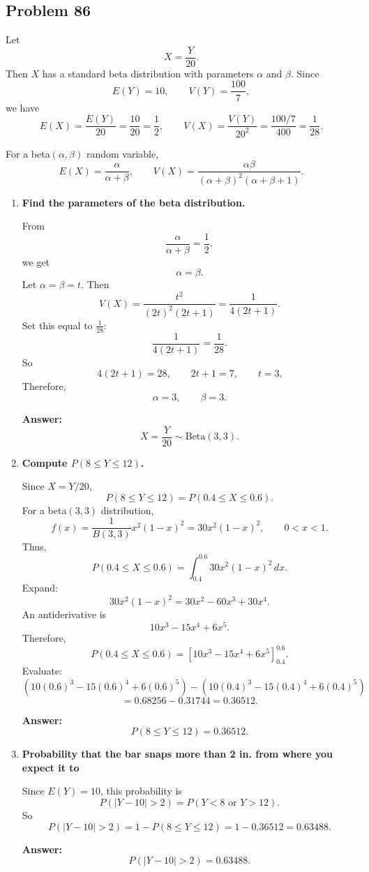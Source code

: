 \subsection*{Problem 86}

Let
\[
X=\frac{Y}{20}.
\]
Then $X$ has a standard beta distribution with parameters $\alpha$ and $\beta$. Since
\[
E(Y)=10,\qquad V(Y)=\frac{100}{7},
\]
we have
\[
E(X)=\frac{E(Y)}{20}=\frac{10}{20}=\frac12,
\qquad
V(X)=\frac{V(Y)}{20^2}=\frac{100/7}{400}=\frac{1}{28}.
\]

For a beta$(\alpha,\beta)$ random variable,
\[
E(X)=\frac{\alpha}{\alpha+\beta},
\qquad
V(X)=\frac{\alpha\beta}{(\alpha+\beta)^2(\alpha+\beta+1)}.
\]

\begin{enumerate}
    \item[(a)] \textbf{Find the parameters of the beta distribution.}

    From
    \[
    \frac{\alpha}{\alpha+\beta}=\frac12,
    \]
    we get
    \[
    \alpha=\beta.
    \]
    Let $\alpha=\beta=t$. Then
    \[
    V(X)=\frac{t^2}{(2t)^2(2t+1)}=\frac{1}{4(2t+1)}.
    \]
    Set this equal to $\frac{1}{28}$:
    \[
    \frac{1}{4(2t+1)}=\frac{1}{28}.
    \]
    So
    \[
    4(2t+1)=28,
    \qquad
    2t+1=7,
    \qquad
    t=3.
    \]
    Therefore,
    \[
    \alpha=3,\qquad \beta=3.
    \]

    \textbf{Answer:}
    \[
    X=\frac{Y}{20}\sim \mathrm{Beta}(3,3).
    \]

    \item[(b)] \textbf{Compute $P(8\le Y\le 12)$.}

    Since $X=Y/20$,
    \[
    P(8\le Y\le 12)=P\left(0.4\le X\le 0.6\right).
    \]
    For a beta$(3,3)$ distribution,
    \[
    f(x)=\frac{1}{B(3,3)}x^{2}(1-x)^2=30x^2(1-x)^2,\qquad 0<x<1.
    \]
    Thus,
    \[
    P(0.4\le X\le 0.6)=\int_{0.4}^{0.6}30x^2(1-x)^2\,dx.
    \]
    Expand:
    \[
    30x^2(1-x)^2=30x^2-60x^3+30x^4.
    \]
    An antiderivative is
    \[
    10x^3-15x^4+6x^5.
    \]
    Therefore,
    \[
    P(0.4\le X\le 0.6)=\left[10x^3-15x^4+6x^5\right]_{0.4}^{0.6}.
    \]
    Evaluate:
    \[
    \left(10(0.6)^3-15(0.6)^4+6(0.6)^5\right)
    -
    \left(10(0.4)^3-15(0.4)^4+6(0.4)^5\right)
    \]
    \[
    =0.68256-0.31744=0.36512.
    \]

    \textbf{Answer:}
    \[
    P(8\le Y\le 12)=0.36512.
    \]

    \item[(c)] \textbf{Probability that the bar snaps more than 2 in. from where you expect it to}

    Since $E(Y)=10$, this probability is
    \[
    P(|Y-10|>2)=P(Y<8\text{ or }Y>12).
    \]
    So
    \[
    P(|Y-10|>2)=1-P(8\le Y\le 12)=1-0.36512=0.63488.
    \]

    \textbf{Answer:}
    \[
    P(|Y-10|>2)=0.63488.
    \]
\end{enumerate}

